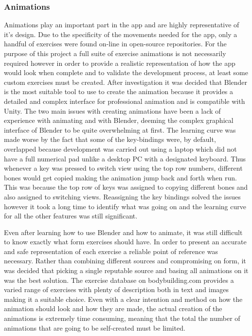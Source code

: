 \documentclass{l4proj}
\begin{document}
\subsubsection{Animations}
Animations play an important part in the app and are highly representative of it's design. Due to the specificity of the movements needed for the app, only a handful of exercises were found on-line in open-source repositories. For the purpose of this project a full suite of exercise animations is not necessarily required however in order to provide a realistic representation of how the app would look when complete and to validate the development process, at least some custom exercises must be created. After investigation it was decided that Blender is the most suitable tool to use to create the animation because it provides a detailed and complex interface for professional animation and is compatible with Unity. The two main issues with creating animations have been a lack of experience with animating and with Blender, deeming the complex graphical interface of Blender to be quite overwhelming at first. The learning curve was made worse by the fact that some of the key-bindings were, by default, overlapped because development was carried out using a laptop which did not have a full numerical pad unlike a desktop PC with a designated keyboard. Thus whenever a key was pressed to switch view using the top row numbers, different bones would get copied making the animation jump back and forth when run. This was because the top row of keys was assigned to copying different bones and also assigned to switching views. Reassigning the key bindings solved the issues however it took a long time to identify what was going on and the learning curve for all the other features was still significant.

Even after learning how to use Blender and how to animate, it was still difficult to know exactly what form exercises should have. In order to present an accurate and safe representation of each exercise a reliable point of reference was necessary. Rather than combining different sources and compromising on form, it was decided that picking a single reputable source and basing all animations on it was the best solution.  The exercise database on bodybuilding.com provides a varied range of exercises with plenty of description both in text and images making it a suitable choice. Even with a clear intention and method on how the animation should look and how they are made, the actual creation of the animations is extremely time consuming, meaning that the total the number of animations that are going to be self-created must be limited.
\end{document}
